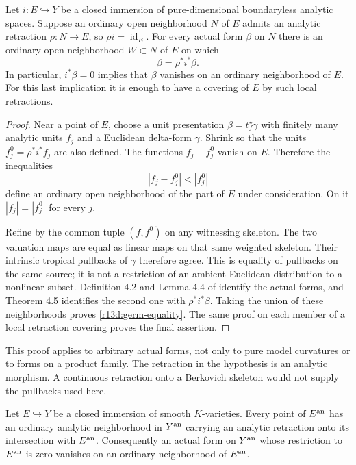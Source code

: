 \begin{lemma}
\label{r13d:retraction-germ}
Let $i:E\hookrightarrow Y$ be a closed immersion of pure-dimensional
boundaryless analytic spaces.  Suppose an ordinary open neighborhood
$N$ of $E$ admits an analytic retraction $\rho:N\to E$, so
$\rho i=\operatorname{id}_E$.  For every actual form $\beta$ on $N$
there is an ordinary open neighborhood $W\subset N$ of $E$ on which
\[
                         \beta=\rho^*i^*\beta.
\tag{R13.D1}\label{r13d:germ-equality}
\]
In particular, $i^*\beta=0$ implies that $\beta$ vanishes on an
ordinary neighborhood of $E$.  For this last implication it is enough
to have a covering of $E$ by such local retractions.
\end{lemma}

\begin{proof}
Near a point of $E$, choose a unit presentation
$\beta=t_f^\star\gamma$ with finitely many analytic units $f_j$ and
a Euclidean delta-form $\gamma$.  Shrink so that the units
$f_j^0=\rho^*i^*f_j$ are also defined.  The functions $f_j-f_j^0$
vanish on $E$.  Therefore the inequalities
\[
                          |f_j-f_j^0|<|f_j^0|
\]
define an ordinary open neighborhood of the part of $E$ under
consideration.  On it $|f_j|=|f_j^0|$ for every $j$.

Refine by the common tuple $(f,f^0)$ on any witnessing skeleton.
The two valuation maps are equal as linear maps on that same weighted
skeleton.  Their intrinsic tropical pullbacks of $\gamma$ therefore
agree.  This is equality of pullbacks on the same source; it is not
a restriction of an ambient Euclidean distribution to a nonlinear
subset.  Definition 4.2 and Lemma 4.4 of \cite{M} identify the actual
forms, and Theorem 4.5 identifies the second one with
$\rho^*i^*\beta$.  Taking the union of these neighborhoods proves
\eqref{r13d:germ-equality}.  The same proof on each member of a local
retraction covering proves the final assertion.
\end{proof}

This proof applies to arbitrary actual forms, not only to pure model
curvatures or to forms on a product family.  The retraction in the
hypothesis is an analytic morphism.  A continuous retraction onto a
Berkovich skeleton would not supply the pullbacks used here.

\begin{lemma}
\label{r13d:smooth-local-retraction}
Let $E\hookrightarrow Y$ be a closed immersion of smooth
$K$-varieties.  Every point of $E^{\rm an}$ has an ordinary analytic
neighborhood in $Y^{\rm an}$ carrying an analytic retraction onto
its intersection with $E^{\rm an}$.  Consequently an actual form
on $Y^{\rm an}$ whose restriction to $E^{\rm an}$ is zero vanishes
on an ordinary neighborhood of $E^{\rm an}$.
\end{lemma}

